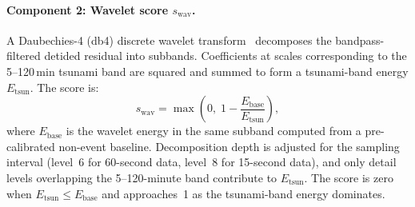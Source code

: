 \documentclass{article}
\begin{document}
\paragraph{Component 2: Wavelet score $s_\text{wav}$.}
A Daubechies-4 (db4) discrete wavelet transform~\citep{daubechies1992ten}
decomposes the bandpass-filtered detided residual into subbands. Coefficients at scales corresponding
to the 5--120\,min tsunami band are squared and summed to form a
tsunami-band energy $E_\text{tsun}$. The score is:
\begin{equation}
  s_\text{wav} = \max\!\left(0,\;
    1 - \frac{E_\text{base}}{E_\text{tsun}}\right),
\end{equation}
where $E_\text{base}$ is the wavelet energy in the same subband computed from
a pre-calibrated non-event baseline. Decomposition depth is adjusted
for the sampling interval (level~6 for 60-second data, level~8 for
15-second data), and only detail levels overlapping the 5--120-minute
band contribute to $E_\text{tsun}$.
The score is zero when
$E_\text{tsun} \leq E_\text{base}$ and approaches~1 as the tsunami-band
energy dominates.
\end{document}
